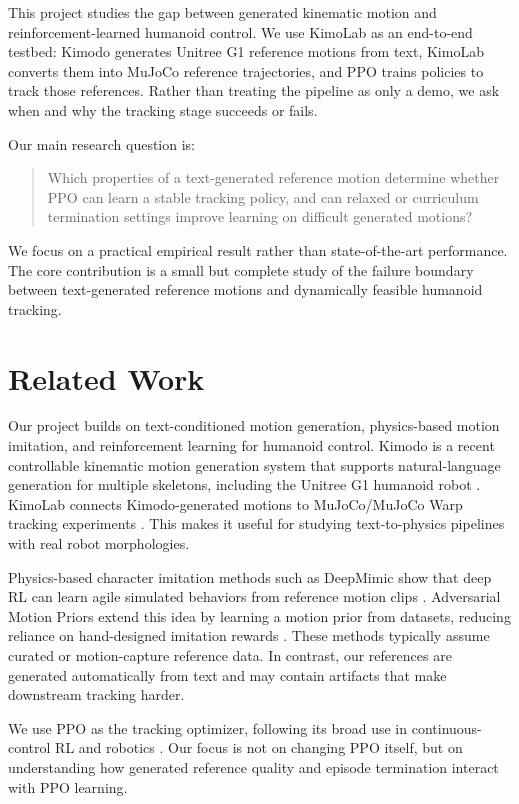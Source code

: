 \documentclass[10pt]{article}
\begin{document}
This project studies the gap between generated kinematic motion and reinforcement-learned humanoid control. We use KimoLab as an end-to-end testbed: Kimodo generates Unitree G1 reference motions from text, KimoLab converts them into MuJoCo reference trajectories, and PPO trains policies to track those references. Rather than treating the pipeline as only a demo, we ask when and why the tracking stage succeeds or fails.

Our main research question is:
\begin{quote}
Which properties of a text-generated reference motion determine whether PPO can learn a stable tracking policy, and can relaxed or curriculum termination settings improve learning on difficult generated motions?
\end{quote}

We focus on a practical empirical result rather than state-of-the-art performance. The core contribution is a small but complete study of the failure boundary between text-generated reference motions and dynamically feasible humanoid tracking.

\section{Related Work}

Our project builds on text-conditioned motion generation, physics-based motion imitation, and reinforcement learning for humanoid control. Kimodo is a recent controllable kinematic motion generation system that supports natural-language generation for multiple skeletons, including the Unitree G1 humanoid robot \cite{kimodo,kimodo_github}. KimoLab connects Kimodo-generated motions to MuJoCo/MuJoCo Warp tracking experiments \cite{kimolab,mujoco,mujocowarp}. This makes it useful for studying text-to-physics pipelines with real robot morphologies.

Physics-based character imitation methods such as DeepMimic show that deep RL can learn agile simulated behaviors from reference motion clips \cite{deepmimic}. Adversarial Motion Priors extend this idea by learning a motion prior from datasets, reducing reliance on hand-designed imitation rewards \cite{amp}. These methods typically assume curated or motion-capture reference data. In contrast, our references are generated automatically from text and may contain artifacts that make downstream tracking harder.

We use PPO as the tracking optimizer, following its broad use in continuous-control RL and robotics \cite{ppo}. Our focus is not on changing PPO itself, but on understanding how generated reference quality and episode termination interact with PPO learning.
\end{document}
